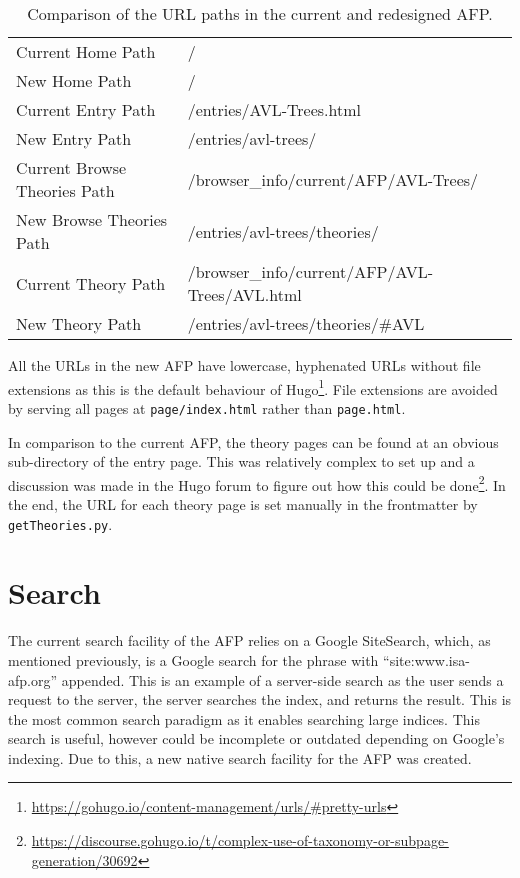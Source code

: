 \documentclass[bsc,frontabs,oneside,singlespacing,parskip,deptreport,logo]{infthesis}
\begin{document}
\begin{table}[h]
\centering
\begin{tabular}{|ll|}
\hline
Current Home Path               & /                                             \\ 
New Home Path            & /                                             \\ \hline
Current Entry Path              & /entries/AVL-Trees.html                       \\ 
New Entry Path           & /entries/avl-trees/                           \\ \hline
Current Browse Theories Path    & /browser\_info/current/AFP/AVL-Trees/         \\ 
New Browse Theories Path & /entries/avl-trees/theories/                  \\ \hline
Current Theory Path             & /browser\_info/current/AFP/AVL-Trees/AVL.html \\ 
New Theory Path          & /entries/avl-trees/theories/\#AVL             \\ \hline
\end{tabular}
\caption{Comparison of the URL paths in the current and redesigned AFP. }
\label{afp-url-path}
\end{table}

All the URLs in the new AFP have lowercase, hyphenated URLs without file extensions as this is the default behaviour of Hugo\footnote{\url{https://gohugo.io/content-management/urls/\#pretty-urls}}. File extensions are avoided by serving all pages at \texttt{page/index.html} rather than \texttt{page.html}.

In comparison to the current AFP, the theory pages can be found at an obvious sub-directory of the entry page. This was relatively complex to set up and a discussion was made in the Hugo forum to figure out how this could be done\footnote{\url{https://discourse.gohugo.io/t/complex-use-of-taxonomy-or-subpage-generation/30692}}. In the end, the URL for each theory page is set manually in the frontmatter by \texttt{getTheories.py}.


\section{Search}



The current search facility of the AFP relies on a Google SiteSearch, which, as mentioned previously, is a Google search for the phrase with ``site:www.isa-afp.org'' appended. This is an example of a server-side search as the user sends a request to the server, the server searches the index, and returns the result. This is the most common search paradigm as it enables searching large indices. This search is useful, however could be incomplete or outdated depending on Google's indexing. Due to this, a new native search facility for the AFP was created.
\end{document}
